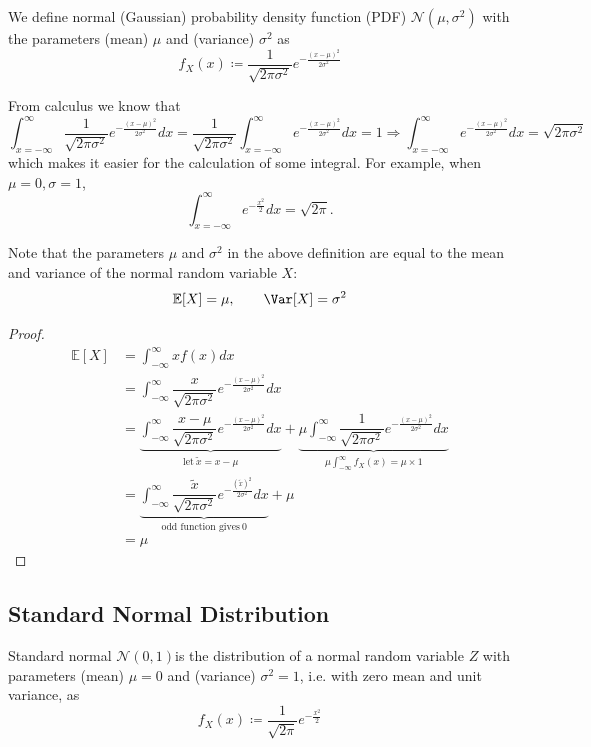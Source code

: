 \begin{definition}
    We define normal (Gaussian) probability density function (PDF) \(\mathcal{N}(\mu, \sigma^2)\) with the parameters (mean) \(\mu\) and (variance) \(\sigma^2\) as 
    \[
        f_X(x) \coloneqq \dfrac{1}{\sqrt{2\pi \sigma ^2}}e^{-\frac{(x - \mu)^2}{2\sigma^2}}
    \]
\end{definition}
\begin{remark}
    From calculus we know that 
    \[
        \int_{x = -\infty}^{\infty} \dfrac{1}{\sqrt{2\pi \sigma ^2}}e^{-\frac{(x - \mu)^2}{2\sigma^2}} dx = \dfrac{1}{\sqrt{2\pi \sigma ^2}}\int_{x = -\infty}^{\infty} e^{-\frac{(x - \mu)^2}{2\sigma^2}} dx = 1 \Longrightarrow \int_{x = -\infty}^{\infty} e^{-\frac{(x - \mu)^2}{2\sigma^2}} dx = \sqrt{2\pi \sigma ^2}
    \]
    which makes it easier for the calculation of some integral. For example, when \(\mu =0, \sigma =1\),
    \[
        \int_{x = -\infty}^{\infty} e^{-\frac{x^2}{2}}dx = \sqrt{2\pi}. 
    \] 
\end{remark}

Note that the parameters \(\mu\) and \(\sigma^2\) in the above definition are equal to the mean and variance of the normal random variable \(X\): 
\[
    \mathbb{E}[X] = \mu, \quad\quad \Var[X] = \sigma^2
\]
\begin{proof}
    \[
    \begin{aligned}
        \mathbb{E}[X] &= \int_{-\infty}^{\infty} xf(x) dx \\
        &= \int_{-\infty}^{\infty} \dfrac{x}{\sqrt{2\pi \sigma ^2}}e^{-\frac{(x - \mu)^2}{2\sigma^2}} dx \\
        &= \underbrace{\int_{-\infty}^{\infty} \dfrac{x - \mu}{\sqrt{2\pi \sigma ^2}}e^{-\frac{(x - \mu)^2}{2\sigma^2}} dx}_{\text{let}\ \tilde{x} = x - \mu} + \underbrace{\mu\int_{-\infty}^{\infty} \dfrac{1}{\sqrt{2\pi \sigma ^2}}e^{-\frac{(x - \mu)^2}{2\sigma^2}} dx}_{\mu\int_{-\infty}^{\infty} f_X(x) = \mu \times 1} \\
        &= \underbrace{\int_{-\infty}^{\infty} \dfrac{\tilde{x}}{\sqrt{2\pi \sigma ^2}}e^{-\frac{(\tilde{x})^2}{2\sigma^2}} dx}_{\text{odd function gives}\ 0} + \mu \\
        &= \mu 
    \end{aligned}
    \]
\end{proof}

\subsection{Standard Normal Distribution}
Standard normal \(\mathcal{N}(0, 1)\)is the distribution of a normal random variable \(Z\) with parameters (mean) \(\mu = 0\) and (variance) \(\sigma^2 = 1\), i.e. with zero mean and unit variance, as 
\[
    f_X(x) \coloneqq \dfrac{1}{\sqrt{2\pi}} e^{-\frac{x^2}{2}}
\]

